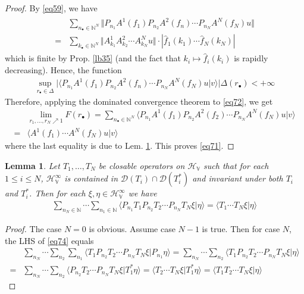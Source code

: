 \documentclass[12pt,b5paper,notitlepage]{article}
\theoremstyle{definition}
\theoremstyle{plain}
\newtheorem{lm}[df]{Lemma}
\newcommand{\wht}{\widehat}
\newcommand{\Dom}{\scr{D}}
\newcommand{\bk}[1]{\langle {#1}\rangle}
\newcommand{\bigbk}[1]{\big\langle {#1}\big\rangle}
\newcommand{\scr}{\mathscr}
\newcommand{\blt}{\bullet}
\newcommand{\Nbb}{\mathbb N}
\newcommand{\HV}{\mathcal H_{\mathbb V}}
\numberwithin{equation}{section}
\begin{document}
\begin{proof}
By \eqref{eq59}, we have
\begin{align*}
\begin{aligned}\label{eq73}
&\sum_{n_\blt\in\Nbb^N}\big\Vert P_{n_1}A^1(f_1)P_{n_2}A^2(f_n)\cdots P_{n_N}A^N(f_N)u\big\Vert\\
=&\sum_{k_\blt\in\Nbb^N}\big\Vert A^1_{k_1}A^2_{k_2}\cdots A^N_{k_N}u\big\Vert\cdot |\wht f_1(k_1)\cdots \wht f_N(k_N)|
\end{aligned}\tag{$\star$}
\end{align*}
which is finite by Prop. \ref{lb35} (and the fact that $k_i\mapsto\wht f_i(k_i)$ is rapidly decreasing). Hence, the function
\begin{align*}
\sup_{r_\blt\in\Delta}\Big|\bigbk{P_{n_1}A^1(f_1)P_{n_2}A^2(f_n)\cdots P_{n_N}A^N(f_N)u|v } \Big|\Delta(r_\blt)<+\infty
\end{align*}
Therefore, applying the dominated convergence theorem to \eqref{eq72}, we get
\begin{align*}
&\lim_{r_1,\dots,r_N\nearrow1}F(r_\blt)=\sum_{n_\blt\in\Nbb^N}\bk{P_{n_1}A^1(f_1)P_{n_2}A^2(f_2)\cdots P_{n_N}A^N(f_N)u|v}\\
=& \bk{A^1(f_1)\cdots A^N(f_N)u|v}
\end{align*}
where the last equality is due to Lem. \ref{lb47}. This proves \eqref{eq71}.
\end{proof}

\begin{lm}\label{lb47}
Let $T_1,\dots,T_N$ be closable operators on $\HV$ such that for each $1\leq i\leq N$, $\HV^\infty$ is contained in $\Dom(T_i)\cap\Dom(T_i^*)$ and invariant under both $T_i$ and $T_i^*$. Then for each $\xi,\eta\in\HV^\infty$ we have
\begin{align}\label{eq74}
\sum_{n_N\in\Nbb}\cdots \sum_{n_1\in\Nbb}\bk{P_{n_1}T_1P_{n_2}T_2\cdots P_{n_N}T_N\xi|\eta}=\bk{T_1\cdots T_N\xi|\eta}
\end{align}
\end{lm}


\begin{proof}
The case $N=0$ is obvious. Assume case $N-1$ is true. Then for case $N$, the LHS of \eqref{eq74} equals
\begin{align*}
&\sum_{n_N}\cdots \sum_{n_2}\sum_{n_1}\bk{T_1P_{n_2}T_2\cdots P_{n_N}T_N\xi|P_{n_1}\eta}=\sum_{n_N}\cdots \sum_{n_2}\bk{T_1P_{n_2}T_2\cdots P_{n_N}T_N\xi|\eta}\\
=&\sum_{n_N}\cdots \sum_{n_2}\bk{P_{n_2}T_2\cdots P_{n_N}T_N\xi|T_1^*\eta}=\bk{T_2\cdots T_N\xi|T_1^*\eta}=\bk{T_1T_2\cdots T_N\xi|\eta}
\end{align*}
\end{proof}
\end{document}
